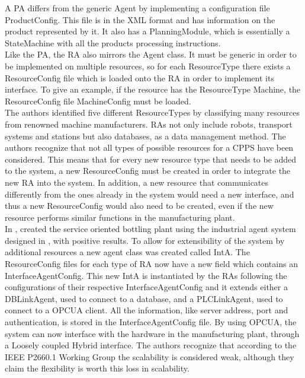 A \gls{PA} differs from the generic Agent by implementing a configuration file ProductConfig. This file is in the \gls{XML} format and has information on the product represented by it. It also has a PlanningModule, which is essentially a StateMachine with all the products processing instructions.\\

Like the \gls{PA}, the \gls{RA} also mirrors the Agent class. It must be generic in order to be implemented on multiple resources, so for each ResourceType there exists a ResourceConfig file which is loaded onto the \gls{RA} in order to implement its interface. To give an example, if the resource has the ResourceType Machine, the ResourceConfig file MachineConfig must be loaded.\\

The authors identified five different ResourceTypes by classifying many resources from renowned machine manufacturers. \gls{RA}s not only include robots, transport systems and stations but also databases, as a data management method. The authors recognize that not all types of possible resources for a \gls{CPPS} have been considered. This means that for every new resource type that needs to be added to the system, a new ResourceConfig must be created in order to integrate the new \gls{RA} into the system. In addition, a new resource that communicates differently from the ones already in the system would need a new interface, and thus a new ResourceConfig would also need to be created, even if the new resource performs similar functions in the manufacturing plant.\\

In \cite{bottling_plant_part2}, \citeauthor{bottling_plant_part2} created the service oriented bottling plant using the industrial agent system designed in \cite{bottling_plant_part1}, with positive results. To allow for extensibility of the system by additional resources a new agent class was created called \gls{IntA}. The ResourceConfig files for each type of \gls{RA} now have a new field which contains an InterfaceAgentConfig. This new \gls{IntA} is instantiated by the \gls{RA}s following the configurations of their respective InterfaceAgentConfig and it extends either a DBLinkAgent, used to connect to a database, and a PLCLinkAgent, used to connect to a \gls{OPCUA} client. All the information, like server address, port and authentication, is stored in the InterfaceAgentConfig file. By using \gls{OPCUA}, the system can now interface with the hardware in the manufacturing plant, through a Loosely coupled Hybrid interface. The authors recognize that according to the IEEE P2660.1 Working Group the scalability is considered weak, although they claim the flexibility is worth this loss in scalability.\\

